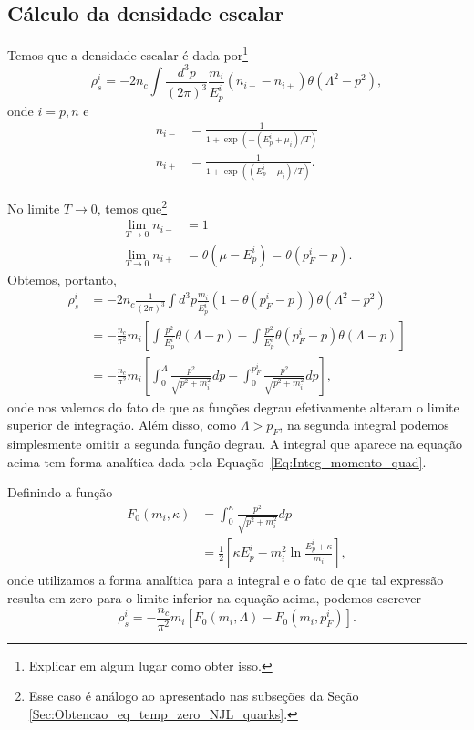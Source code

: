 \subsection{Cálculo da densidade escalar}

Temos que a densidade escalar é dada por\footnote{Explicar em algum lugar como obter isso.}
\begin{equation}
	\rho_s^i = - 2 n_c \int \frac{d^3p}{(2\pi)^3}\frac{m_i}{E_p^i}(n_{i-} - n_{i+}) \theta(\Lambda^2 - p^2),
\end{equation}
%
onde $i = p, n$ e
\begin{align}
	n_{i-} &= \frac{1}{1 + \exp(-(E_p^i+\mu_i)/T)} \\
	n_{i+} &= \frac{1}{1 + \exp((E_p^i-\mu_i)/T)}.
\end{align}

No limite $T \to 0$, temos que\footnote{Esse caso é análogo ao apresentado nas subseções da Seção \ref{Sec:Obtencao_eq_temp_zero_NJL_quarks}.}
\begin{align}
	\lim_{T \to 0} n_{i-} &= 1 \\
	\lim_{T \to 0} n_{i+} &= \theta(\mu - E_p^i) = \theta(p_F^i - p).
\end{align}
%
Obtemos, portanto,
\begin{align}
	\rho_s^i &= - 2 n_c \frac{1}{(2\pi)^3} \int d^3p \frac{m_i}{E_p^i} (1 - \theta(p_F^i - p)) \theta(\Lambda^2 - p^2)\\
	&= -\frac{n_c}{\pi^2} m_i \left[\int \frac{p^2}{E_p^i} \theta(\Lambda - p) - \int \frac{p^2}{E_p^i}\theta(p_F^i - p)\theta(\Lambda - p)\right]\\
	&= -\frac{n_c}{\pi^2} m_i \left[\int_0^\Lambda \frac{p^2}{\sqrt{p^2+m_i^2}} dp - \int_0^{p_F^i} \frac{p^2}{\sqrt{p^2+m_i^2}} dp \right],
\end{align}
%
onde nos valemos do fato de que as funções degrau efetivamente alteram o limite superior de integração. Além disso, como $\Lambda > p_F$, na segunda integral podemos simplesmente omitir a segunda função degrau. A integral que aparece na equação acima tem forma analítica dada pela Equação~\ref{Eq:Integ_momento_quad}.

Definindo a função
\begin{align}
	F_0(m_i, \kappa) &= \int_0^\kappa \frac{p^2}{\sqrt{p^2 + m_i^2}} dp \\
	&= \frac{1}{2} \left[\kappa E_p^i - m_i^2\ln\frac{E_p^i + \kappa}{m_i} \right],
\end{align}
%
onde utilizamos a forma analítica para a integral e o fato de que tal expressão resulta em zero para o limite inferior na equação acima, podemos escrever
\begin{equation}
	\rho_s^i = -\frac{n_c}{\pi^2} m_i [F_0(m_i, \Lambda) - F_0(m_i,p_F^i)].
\end{equation}

